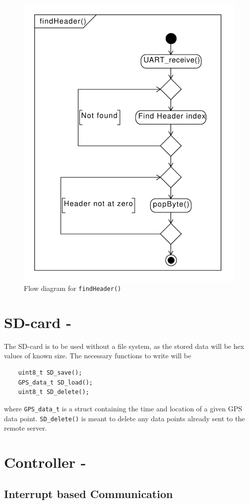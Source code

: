 \begin{figure}
	\centering
	\includegraphics[width=0.7\linewidth]{gfx/Design/GPSFlowFindHeader.pdf}
	\caption{Flow diagram for \texttt{findHeader()}}
	\label{fig:gpsflowfindheader}
\end{figure}


\section{SD-card - \SDsock}
The SD-card is to be used without a file system, as the stored data will be hex values of known size.
The necessary functions to write will be
\begin{verbatim}
	uint8_t SD_save();
	GPS_data_t SD_load();
	uint8_t SD_delete();
\end{verbatim}
where \texttt{GPS_data_t} is a struct containing the time and location of a given GPS data point.
\texttt{SD_delete()} is meant to delete any data points already sent to the remote server.

\section{Controller - \SAMD}

\subsection{Interrupt based Communication}

